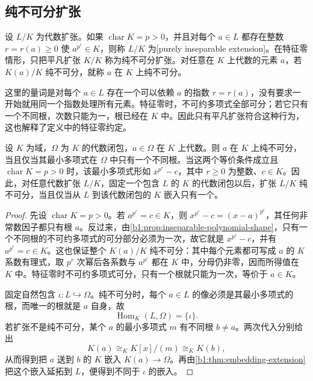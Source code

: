 \subsection{纯不可分扩张}
\label{b1:subsec:1602:03}

\begin{definition}\label{b1:def:purely-inseparable}
	设 \(L/K\) 为代数扩张。如果 \(\operatorname{char}K=p>0\)，并且对每个 \(a\in L\) 都存在整数 \(r=r(a)\geq0\) 使 \(a^{p^r}\in K\)，则称 \(L/K\) 为[purely inseparable extension]。在特征零情形，只把平凡扩张 \(K/K\) 称为纯不可分扩张。对任意在 \(K\) 上代数的元素 \(a\)，若 \(K(a)/K\) 纯不可分，就称 \(a\) 在 \(K\) 上纯不可分。
\end{definition}

这里的量词是对每个 \(a\in L\) 存在一个可以依赖 \(a\) 的指数 \(r=r(a)\)，没有要求一开始就用同一个指数处理所有元素。特征零时，不可约多项式全部可分；若它只有一个不同根，次数只能为一，根已经在 \(K\) 中。因此只有平凡扩张符合这种行为，这也解释了定义中的特征零约定。

\begin{proposition}\label{b1:prop:purely-inseparable-criteria}
	设 \(K\) 为域，\(\Omega\) 为 \(K\) 的代数闭包，\(a\in\Omega\) 在 \(K\) 上代数。则 \(a\) 在 \(K\) 上纯不可分，当且仅当其最小多项式在 \(\Omega\) 中只有一个不同根。当这两个等价条件成立且 \(\operatorname{char}K=p>0\) 时，该最小多项式形如 \(x^{p^r}-c\)，其中 \(r\geq0\) 为整数、\(c\in K\)。因此，对任意代数扩张 \(L/K\)，固定一个包含 \(L\) 的 \(K\) 的代数闭包以后，扩张 \(L/K\) 纯不可分，当且仅当从 \(L\) 到该代数闭包的 \(K\) 嵌入只有一个。
\end{proposition}
\begin{proof}
	先设 \(\operatorname{char}K=p>0\)。若 \(a^{p^r}=c\in K\)，则 \(x^{p^r}-c=(x-a)^{p^r}\)，其任何非常数因子都只有根 \(a\)。反过来，由\cref{b1:prop:inseparable-polynomial-shape}，只有一个不同根的不可约多项式的可分部分必须为一次，故它就是 \(x^{p^r}-c\)，并有 \(a^{p^r}=c\in K\)。这也保证整个 \(K(a)/K\) 纯不可分：其中每个元素都可写成 \(a\) 的 \(K\) 系数有理式，取 \(p^r\) 次幂后各系数与 \(a^{p^r}\) 都在 \(K\) 中，分母仍非零，因而所得值在 \(K\) 中。特征零时不可约多项式可分，只有一个根就只能为一次，等价于 \(a\in K\)。

	固定自然包含 \(\iota:L\hookrightarrow\Omega\)。纯不可分时，每个 \(a\in L\) 的像必须是其最小多项式的根，而唯一的根就是 \(a\) 自身，故
	\[
		\operatorname{Hom}_K(L,\Omega)=\{\iota\}.
	\]
	若扩张不是纯不可分，某个 \(a\) 的最小多项式 \(m\) 有不同根 \(b\neq a\)。两次代入分别给出
	\[
		K(a)\cong_K K[x]/(m)\cong_K K(b),
	\]
	从而得到把 \(a\) 送到 \(b\) 的 \(K\) 嵌入 \(K(a)\rightarrow\Omega\)。再由\cref{b1:thm:embedding-extension}把这个嵌入延拓到 \(L\)，便得到不同于 \(\iota\) 的嵌入。
\end{proof}

